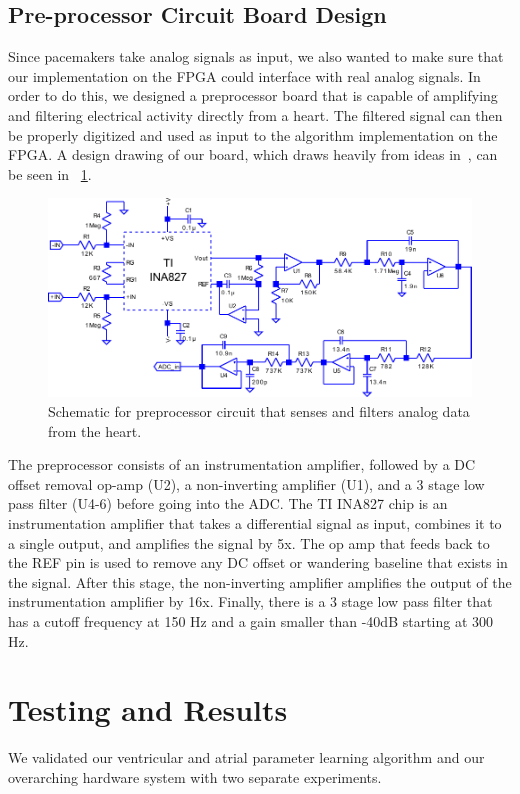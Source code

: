 \documentclass[conference]{IEEEtran}
\begin{document}
\subsection{Pre-processor Circuit Board Design}
Since pacemakers take analog signals as input,
we also wanted to make sure that our implementation on the
FPGA could interface with real analog signals.
In order to do this, we designed a preprocessor board that is
capable of amplifying and filtering electrical activity directly from a heart.
The filtered signal can then be properly 
digitized and used as input to the algorithm implementation
on the FPGA. A design drawing of our board, which
draws heavily from ideas in~\cite{analog-adcs}, 
can be seen in \figurename~\ref{fig:schematic}.

\begin{figure}[h]
	\centering
	\includegraphics[width=.9\columnwidth]{schematic.pdf}
	\caption{Schematic for preprocessor circuit that senses and filters analog data from the heart.}
	\label{fig:schematic}
\end{figure}

The preprocessor consists of an instrumentation
amplifier, followed by a DC offset removal op-amp (U2), a
non-inverting amplifier (U1), and a 3 stage low pass filter (U4-6)
before going into the ADC.
The TI INA827 chip is an instrumentation
amplifier that takes a differential signal as input,
combines it to a single output, and amplifies the signal
by 5x. The op amp that feeds back to the REF pin is used to
remove any DC offset or wandering baseline that exists
in the signal. After this stage, the non-inverting amplifier
amplifies the output of the instrumentation amplifier by
16x. Finally, there is a 3 stage low pass filter that has a
cutoff frequency at 150 Hz and a gain smaller than -40dB 
starting at 300 Hz. 

\section{Testing and Results}
We validated our ventricular and atrial parameter
learning algorithm and our overarching hardware system
with two separate experiments.
\end{document}
